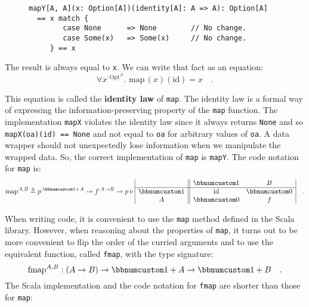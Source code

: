 \begin{wrapfigure}{l}{0.58\columnwidth}%
\vspace{-0.6\baselineskip}
\begin{lstlisting}
mapY[A, A](x: Option[A])(identity[A]: A => A): Option[A]
  == x match {
        case None      => None        // No change.
        case Some(x)   => Some(x)     // No change.
     } == x
\end{lstlisting}
\vspace{0.1\baselineskip}
\end{wrapfigure}%

\noindent The result is always equal to \lstinline!x!. We can write
that fact as an equation:\vspace{-0.3\baselineskip}
\[
\forall x^{:\text{Opt}^{A}}.\,\,\text{map}\,(x)(\text{id})=x\quad.
\]
\vspace{-0.85\baselineskip}

\noindent This equation is called the \textbf{identity law}
of \lstinline!map!. The identity law is a formal way of expressing
the information-preserving property of the \lstinline!map! function.
The implementation \lstinline!mapX! violates the identity law since
it always returns \lstinline!None! and so \lstinline!mapX(oa)(id) == None!
and not equal to \lstinline!oa! for arbitrary values of \lstinline!oa!.
A data wrapper should not unexpectedly lose information when we manipulate
the wrapped data. So, the correct implementation of \lstinline!map!
is \lstinline!mapY!. The code notation for \lstinline!map! is:\vspace{-0.4\baselineskip}
\[
\text{map}^{A,B}\triangleq p^{:\bbnum 1+A}\rightarrow f^{:A\rightarrow B}\rightarrow p\triangleright\begin{array}{|c||cc|}
 & \bbnum 1 & B\\
\hline \bbnum 1 & \text{id} & \bbnum 0\\
A & \bbnum 0 & f
\end{array}\quad.
\]

When writing code, it is convenient to use the \lstinline!map! method
defined in the Scala library. However, when reasoning about the properties
of \lstinline!map!, it turns out to be more convenient to flip the
order of the curried arguments and to use the equivalent function,
called \lstinline!fmap!, with the type signature:
\[
\text{fmap}^{A,B}:\left(A\rightarrow B\right)\rightarrow\bbnum 1+A\rightarrow\bbnum 1+B\quad.
\]
The Scala implementation and the code notation for \lstinline!fmap!
are shorter than those for \lstinline!map!:

